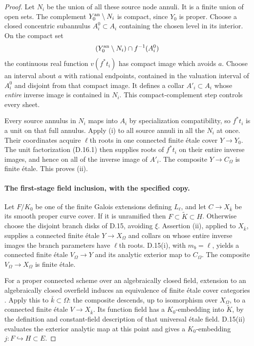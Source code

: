 \begin{proof}
Let $N_i$ be the union of all these source node annuli. It is a
finite union of open sets. The complement
$Y_0^{\rm an}\setminus N_i$ is compact, since $Y_0$ is proper.
Choose a closed concentric subannulus $A_i^0\subset A_i$
containing the chosen level in its interior. On the compact set
\[
 (Y_0^{\rm an}\setminus N_i)\cap f^{-1}(A_i^0)
\]
the continuous real function $v(f^*t_i)$ has compact image
which avoids $a$. Choose an interval about $a$ with rational
endpoints, contained in the valuation interval of $A_i^0$ and
disjoint from that compact image. It defines a collar
$A'_i\subset A_i$ whose \emph{entire} inverse image is contained
in $N_i$. This compact-complement step controls every sheet.

Every source annulus in $N_i$ maps into $A_i$ by specialization
compatibility, so $f^*t_i$ is a unit on that full annulus.
Apply (i) to all source annuli in all the $N_i$ at once.
Their coordinates acquire $\ell$th roots in one connected
finite \'etale cover $Y\to Y_0$. The unit factorization
(D.16.1) then supplies roots of $f^*t_i$ on their entire inverse
images, and hence on all of the inverse image of $A'_i$.
The composite $Y\to C_\Omega$ is finite \'etale. This proves (ii).

\paragraph{The first-stage field inclusion, with the specified copy.}
Let $F/K_0$ be one of the finite Galois extensions defining
$L_\ell$, and let $C\to X_{\bar k}$ be its smooth proper curve
cover. If it is unramified then $F\subset\widetilde K\subset H$.
Otherwise choose the disjoint branch disks of D.15, avoiding
$\xi$. Assertion (ii), applied to $X_{\bar k}$, supplies a
connected finite \'etale $Y\to X_\Omega$ and collars on whose
entire inverse images the branch parameters have $\ell$th roots.
D.15(i), with $m_b=\ell$, yields a connected finite \'etale
$V_\Omega\to Y$ and its analytic exterior map to $C_\Omega$.
The composite $V_\Omega\to X_\Omega$ is finite \'etale.

For a proper connected scheme over an algebraically closed field,
extension to an algebraically closed overfield induces an
equivalence of finite \'etale cover categories
\citep[Expos\'e X, Corollary 1.8]{E_SGA1}. Apply this to
$\bar k\subset\Omega$: the composite descends, up to
isomorphism over $X_\Omega$, to a connected finite \'etale
$V\to X_{\bar k}$. Its function field has a $K_0$-embedding
into $\widetilde K$, by the definition and constant-field
description of that universal \'etale field. D.15(ii) evaluates
the exterior analytic map at this point and gives a
$K_0$-embedding $j:F\hookrightarrow H\subset E$.


\end{proof}
